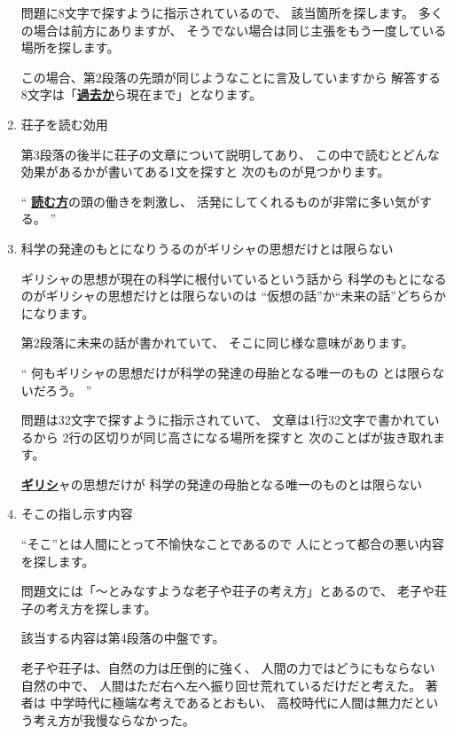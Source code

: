 \documentclass[10pt,b5paper]{ltjsarticle}
\begin{document}
\begin{enumerate}
       問題に8文字で探すように指示されているので、
       該当箇所を探します。
       多くの場合は前方にありますが、
       そうでない場合は同じ主張をもう一度している場所を探します。

       この場合、第2段落の先頭が同じようなことに言及していますから
       解答する8文字は「\underline{\textbf{過去か}}ら現在まで」となります。

 \item 荘子を読む効用

       第3段落の後半に荘子の文章について説明してあり、
       この中で読むとどんな効果があるかが書いてある1文を探すと
       次のものが見つかります。

       ``
       \underline{\textbf{読む方}}の頭の働きを刺激し、
       活発にしてくれるものが非常に多い気がする。
       ''

 \item 科学の発達のもとになりうるのがギリシャの思想だけとは限らない

       ギリシャの思想が現在の科学に根付いているという話から
       科学のもとになるのがギリシャの思想だけとは限らないのは
       ``仮想の話''か``未来の話''どちらかになります。

       第2段落に未来の話が書かれていて、
       そこに同じ様な意味があります。

       ``
       何もギリシャの思想だけが科学の発達の母胎となる唯一のもの
       とは限らないだろう。
       ''

       問題は32文字で探すように指示されていて、
       文章は1行32文字で書かれているから
       2行の区切りが同じ高さになる場所を探すと
       次のことばが抜き取れます。

       \underline{\textbf{ギリシ}}ャの思想だけが
       科学の発達の母胎となる唯一のものとは限らない

 \item そこの指し示す内容

       ``そこ''とは人間にとって不愉快なことであるので
       人にとって都合の悪い内容を探します。

       問題文には「～とみなすような老子や荘子の考え方」とあるので、
       老子や荘子の考え方を探します。

       該当する内容は第4段落の中盤です。
       
       老子や荘子は、自然の力は圧倒的に強く、
       人間の力ではどうにもならない自然の中で、
       人間はただ右へ左へ振り回せ荒れているだけだと考えた。
       著者は 中学時代に極端な考えであるとおもい、
       高校時代に人間は無力だという考え方が我慢ならなかった。


\end{enumerate}
\end{document}
